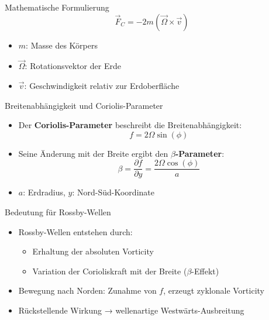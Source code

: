     \begin{frame}{Mathematische Formulierung}
    \begin{equation*}
        \vec{F}_C = -2m (\vec{\Omega} \times \vec{v})
    \end{equation*}
    \vspace{0.5cm}
    \begin{itemize}
        \item \( m \): Masse des Körpers
        \item \( \vec{\Omega} \): Rotationsvektor der Erde
        \item \( \vec{v} \): Geschwindigkeit relativ zur Erdoberfläche
    \end{itemize}
    \end{frame}
    
    \begin{frame}{Breitenabhängigkeit und Coriolis-Parameter}
    \begin{itemize}
        \item Der \textbf{Coriolis-Parameter} beschreibt die Breitenabhängigkeit:
        \[
            f = 2 \Omega \sin(\phi)
        \]
        \item Seine Änderung mit der Breite ergibt den \textbf{\(\beta\)-Parameter}:
        \[
            \beta = \frac{\partial f}{\partial y} = \frac{2 \Omega \cos(\phi)}{a}
        \]
        \item \(a\): Erdradius, \quad \(y\): Nord-Süd-Koordinate
    \end{itemize}
    \end{frame}
    
    \begin{frame}{Bedeutung für Rossby-Wellen}
    \begin{itemize}
        \item Rossby-Wellen entstehen durch:
        \begin{itemize}
            \item Erhaltung der absoluten Vorticity
            \item Variation der Corioliskraft mit der Breite (\(\beta\)-Effekt)
        \end{itemize}
        \item Bewegung nach Norden: Zunahme von \(f\), erzeugt zyklonale Vorticity
        \item Rückstellende Wirkung → wellenartige Westwärts-Ausbreitung
    \end{itemize}
    \end{frame}
    
